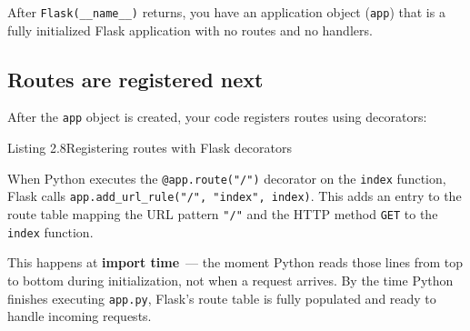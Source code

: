 \noindent{}After \texttt{Flask(\_\_name\_\_)} returns, you have an application object (\texttt{app}) that is a fully initialized Flask application with no routes and no handlers.

\subsection*{Routes are registered next}\label{02-runtime-initialization:routes-are-registered-next}

After the \texttt{app} object is created, your code registers routes using decorators:

\begin{codeboxcap}[short]{\textcolor{accent}{Listing 2.8}\enspace Registering routes with Flask decorators}

\begin{Shaded}
\begin{Highlighting}[]

\OperatorTok{=}\NormalTok{)}

\NormalTok{(}\NormalTok{)}
    \NormalTok{: }\NormalTok{\})}

\NormalTok{(}\OperatorTok{=}\NormalTok{[}\NormalTok{])}
    \NormalTok{: []\})}
\end{Highlighting}
\end{Shaded}

\end{codeboxcap}

\noindent{}When Python executes the \texttt{@app.route("/")} decorator on the \texttt{index} function, Flask calls \texttt{app.}\allowbreak{}\texttt{add\_}\allowbreak{}\texttt{url\_}\allowbreak{}\texttt{rule("/}\allowbreak{}\texttt{",}\allowbreak{}\texttt{\ "index",}\allowbreak{}\texttt{\ index)}. This adds an entry to the route table mapping the URL pattern \texttt{"/"} and the HTTP method \texttt{GET} to the \texttt{index} function.

This happens at \textbf{import time}~--- the moment Python reads those lines from top to bottom during initialization, not when a request arrives. By the time Python finishes executing \texttt{app.py}, Flask's route table is fully populated and ready to handle incoming requests.

